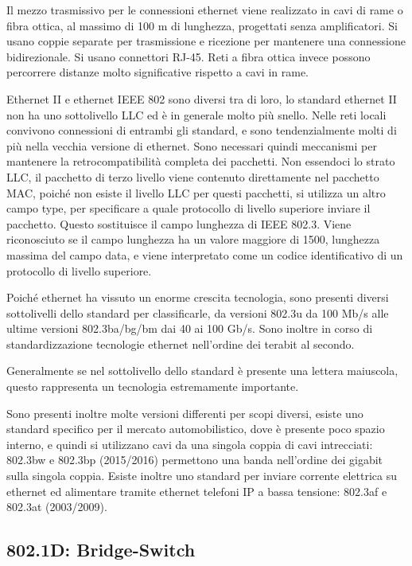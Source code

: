 \documentclass{article}
\numberwithin{equation}{subsection}
\begin{document}
Il mezzo trasmissivo per le connessioni ethernet viene realizzato in cavi di rame o fibra ottica, al massimo di 100 m di lunghezza, progettati senza amplificatori. Si usano coppie separate per trasmissione e 
ricezione per mantenere una connessione bidirezionale. Si usano connettori RJ-45. Reti a fibra ottica invece possono percorrere distanze molto significative rispetto a cavi in rame. 

Ethernet II e ethernet IEEE 802 sono diversi tra di loro, lo standard ethernet II non ha uno sottolivello LLC ed è in generale molto più snello. Nelle reti locali convivono connessioni di entrambi gli standard, e 
sono tendenzialmente molti di più nella vecchia versione di ethernet. Sono necessari quindi meccanismi per mantenere la retrocompatibilità completa dei pacchetti. 
Non essendoci lo strato LLC, il pacchetto di terzo livello viene contenuto direttamente nel pacchetto MAC, poiché non esiste il livello LLC per questi pacchetti, si utilizza un altro campo type, per specificare a 
quale protocollo di livello superiore inviare il pacchetto. Questo sostituisce il campo lunghezza di IEEE 802.3. Viene riconosciuto se il campo lunghezza ha un valore maggiore di 1500, lunghezza massima del campo 
data, e viene interpretato come un codice identificativo di un protocollo di livello superiore. 


Poiché ethernet ha vissuto un enorme crescita tecnologia, sono presenti diversi sottolivelli dello standard per classificarle, da versioni 802.3u da 100 Mb/s alle ultime versioni 802.3ba/bg/bm dai 40 ai 100 
Gb/s. Sono inoltre in corso di standardizzazione tecnologie ethernet nell'ordine dei terabit al secondo.  

Generalmente se nel sottolivello dello standard è presente una lettera maiuscola, questo rappresenta un tecnologia estremamente importante. 


Sono presenti inoltre molte versioni differenti per scopi diversi, esiste uno standard specifico per il mercato automobilistico, dove è presente poco spazio interno, e quindi si utilizzano cavi da una singola coppia 
di cavi intrecciati: 802.3bw e 802.3bp (2015/2016) permettono una banda nell'ordine dei gigabit sulla singola coppia. Esiste inoltre uno standard per inviare corrente elettrica su ethernet ed alimentare tramite 
ethernet telefoni IP a bassa tensione: 802.3af e 802.3at (2003/2009). 

\subsection{802.1D: Bridge-Switch}
\end{document}
